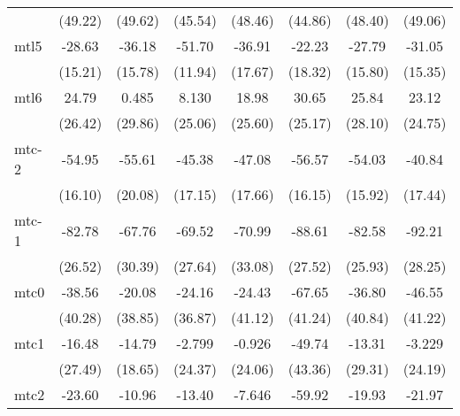\documentclass{article}
\begin{document}
{\begin{longtable}{l*{7}{c}}
                &  (49.22)         &  (49.62)         &  (45.54)         &  (48.46)         &  (44.86)         &  (48.40)         &  (49.06)         \\
mtl5            &   -28.63         &   -36.18         &   -51.70\sym{**} &   -36.91         &   -22.23         &   -27.79         &   -31.05         \\
                &  (15.21)         &  (15.78)         &  (11.94)         &  (17.67)         &  (18.32)         &  (15.80)         &  (15.35)         \\
mtl6            &    24.79         &    0.485         &    8.130         &    18.98         &    30.65         &    25.84         &    23.12         \\
                &  (26.42)         &  (29.86)         &  (25.06)         &  (25.60)         &  (25.17)         &  (28.10)         &  (24.75)         \\
mtc-2           &   -54.95\sym{*}  &   -55.61\sym{*}  &   -45.38\sym{*}  &   -47.08\sym{*}  &   -56.57\sym{*}  &   -54.03\sym{*}  &   -40.84         \\
                &  (16.10)         &  (20.08)         &  (17.15)         &  (17.66)         &  (16.15)         &  (15.92)         &  (17.44)         \\
mtc-1           &   -82.78\sym{*}  &   -67.76         &   -69.52         &   -70.99         &   -88.61\sym{*}  &   -82.58\sym{*}  &   -92.21\sym{*}  \\
                &  (26.52)         &  (30.39)         &  (27.64)         &  (33.08)         &  (27.52)         &  (25.93)         &  (28.25)         \\
mtc0            &   -38.56         &   -20.08         &   -24.16         &   -24.43         &   -67.65         &   -36.80         &   -46.55         \\
                &  (40.28)         &  (38.85)         &  (36.87)         &  (41.12)         &  (41.24)         &  (40.84)         &  (41.22)         \\
mtc1            &   -16.48         &   -14.79         &   -2.799         &   -0.926         &   -49.74         &   -13.31         &   -3.229         \\
                &  (27.49)         &  (18.65)         &  (24.37)         &  (24.06)         &  (43.36)         &  (29.31)         &  (24.19)         \\
mtc2            &   -23.60         &   -10.96         &   -13.40         &   -7.646         &   -59.92         &   -19.93         &   -21.97         \\

\end{longtable}}
\end{document}
